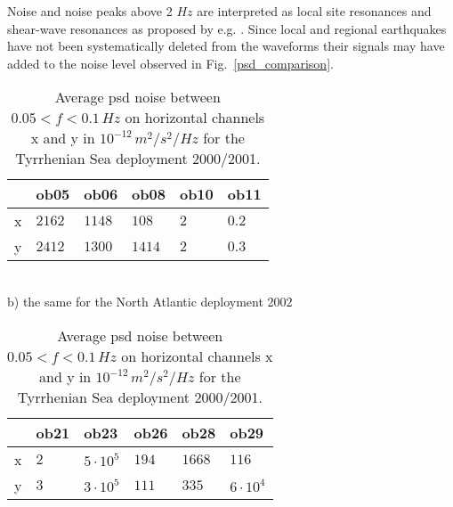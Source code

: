 \documentclass{article}
\begin{document}
{%
Noise and noise peaks above 2 $Hz$ are interpreted as 
local site resonances and shear-wave resonances as proposed by 
e.g.  \cite{godin:99}.
Since local and regional earthquakes have not been systematically 
deleted from the waveforms their signals 
may have added to the noise level observed in 
Fig.~\ref{psd_comparison}.

\begin{table}
\begin{center}
\caption{
Average psd noise between $0.05 < f < 0.1\, Hz$ 
on horizontal channels x and y in 
$10^{-12} \, m^2/s^2 / Hz$ for the 
Tyrrhenian Sea deployment 2000/2001.
}
\vskip0.5cm
\label{hnoise_table}
\begin{tabular}{|l||l|l|l|l|l|}
\hline
& ob05 & ob06 & ob08 & ob10 & ob11 \\
\hline
x  &  
 $2162$ &
 $1148$ &
 $108 $ &
 $2  $ &
 $0.2   $ 
\\
\hline
y &  
 $2412$ &
 $1300$ &
 $1414$ &
 $2   $ &
 $0.3    $ 
\\
\hline
\end{tabular}
\\
\vskip0.5cm
b) the same for the North Atlantic deployment 2002
\vskip0.5cm
\begin{tabular}{|l||l|l|l|l|l|}
\hline
& ob21 & ob23 & ob26 & ob28 & ob29 \\
\hline
x &  
 $2  $ &
 $5\cdot 10^5 $ &
 $194  $ &
 $1668 $ &
 $116  $ 
\\
\hline
y &  
 $3  $ &
 $3\cdot 10^5$ &
 $111 $ &
 $335 $ &
 $6\cdot 10^4$ 
\\
\hline
\end{tabular}
\end{center}
\end{table}
%
%
}
\end{document}
